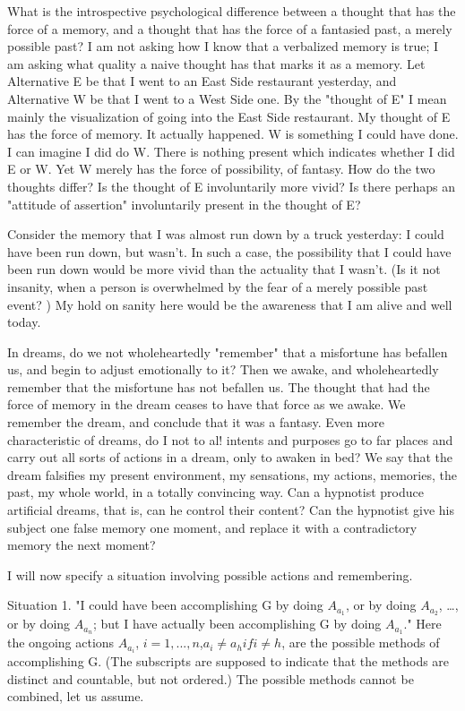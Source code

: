 \documentclass[10pt,twoside,draft]{memoir}
\begin{document}
{What is the introspective psychological difference between a thought 
that has the force of a memory, and a thought that has the force of a 
fantasied past, a merely possible past? I am not asking how I know that a 
verbalized memory is true; I am asking what quality a naive thought has that 
marks it as a memory. Let Alternative E be that I went to an East Side 
restaurant yesterday, and Alternative W be that I went to a West Side one. 
By the "thought of E" I mean mainly the visualization of going into the East 
Side restaurant. My thought of E has the force of memory. It actually 
happened. W is something I could have done. I can imagine I did do W. There 
is nothing present which indicates whether I did E or W. Yet W merely has 
the force of possibility, of fantasy. How do the two thoughts differ? Is the 
thought of E involuntarily more vivid? Is there perhaps an "attitude of 
assertion" involuntarily present in the thought of E? 

Consider the memory that I was almost run down by a truck yesterday: 
I could have been run down, but wasn't. In such a case, the possibility that I 
could have been run down would be more vivid than the actuality that I 
wasn't. (Is it not insanity, when a person is overwhelmed by the fear of a 
merely possible past event? ) My hold on sanity here would be the awareness 
that I am alive and well today. 

In dreams, do we not wholeheartedly "remember" that a misfortune 
has befallen us, and begin to adjust emotionally to it? Then we awake, and 
wholeheartedly remember that the misfortune has not befallen us. The 
thought that had the force of memory in the dream ceases to have that force 
as we awake. We remember the dream, and conclude that it was a fantasy. 
Even more characteristic of dreams, do I not to al! intents and purposes go 
to far places and carry out all sorts of actions in a dream, only to awaken in 
bed? We say that the dream falsifies my present environment, my 
sensations, my actions, memories, the past, my whole world, in a totally 
convincing way. Can a hypnotist produce artificial dreams, that is, can he 
control their content? Can the hypnotist give his subject one false memory 
one moment, and replace it with a contradictory memory the next 
moment? 

I will now specify a situation involving possible actions and 
remembering. 

Situation 1. "I could have been accomplishing G by doing $A_{a_1}$, or by 
doing $A_{a_2}$, \ldots, or by doing $A_{a_n}$; but I have actually been accomplishing G by 
doing $A_{a_1}$." Here the ongoing actions $A_{a_i}$, $i=1,...,n$,$a_i\neq a_h if i\neq h$, are 
the possible methods of accomplishing G. (The subscripts are supposed to 
indicate that the methods are distinct and countable, but not ordered.) The 
possible methods cannot be combined, let us assume. 

}
\end{document}
